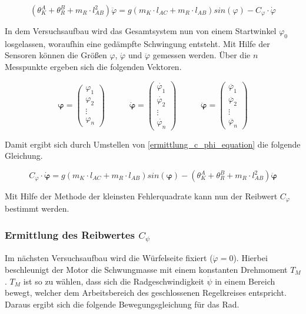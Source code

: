 \begin{equation}
\label{ermittlung_c_phi_equation}
(\theta^A_K + \theta^B_R + m_R  \cdot l_{AB}^2) \ddot{\varphi} = g(m_K \cdot l_{AC} + m_R \cdot l_{AB})sin(\varphi) - C_{\varphi} \cdot \dot{\varphi}
\end{equation}

In dem Versuchsaufbau wird das Gesamtsystem nun von einem Startwinkel $\varphi_0$ losgelassen, woraufhin eine gedämpfte Schwingung entsteht. Mit Hilfe der Sensoren können die Größen $\varphi$, $\dot{\varphi}$ und $\ddot{\varphi}$ gemessen werden. Über die $n$ Messpunkte ergeben sich die folgenden Vektoren.

\begin{equation}
\boldsymbol{\varphi} = \begin{pmatrix} \varphi_1 \\ \varphi_2 \\ \vdots \\ \varphi_n \end{pmatrix} \hspace{35pt}
\boldsymbol{\dot{\varphi}} = \begin{pmatrix}
\dot{\varphi_1} \\ \dot{\varphi_2} \\ \vdots \\ \dot{\varphi_n}
\end{pmatrix} \hspace{35pt}
\boldsymbol{\ddot{\varphi}} = \begin{pmatrix}
\ddot{\varphi_1} \\ \ddot{\varphi_2} \\ \vdots \\ \ddot{\varphi_n}
\end{pmatrix}
\end{equation}

Damit ergibt sich durch Umstellen von \ref{ermittlung_c_phi_equation} die folgende Gleichung.

\begin{equation}
C_{\varphi} \cdot \boldsymbol{\dot{\varphi}} = g(m_K \cdot l_{AC} + m_R \cdot l_{AB})sin(\boldsymbol{\varphi}) - (\theta^A_K + \theta^B_R + m_R  \cdot l_{AB}^2) \boldsymbol{\ddot{\varphi}}
\end{equation}

Mit Hilfe der Methode der kleinsten Fehlerquadrate kann nun der Reibwert $C_{\varphi}$ bestimmt werden.


\subsubsection{Ermittlung des Reibwertes $C_{\psi}$}
Im nächsten Versuchsaufbau wird die Würfelseite fixiert ($\dot{\varphi} = 0$). Hierbei beschleunigt der Motor die Schwungmasse mit einem konstanten Drehmoment $T_M$. $T_M$ ist so zu wählen, dass sich die Radgeschwindigkeit $\dot{\psi}$ in einem Bereich bewegt, welcher dem Arbeitsbereich des geschlossenen Regelkreises entspricht. Daraus ergibt sich die folgende Bewegungsgleichung für das Rad.

